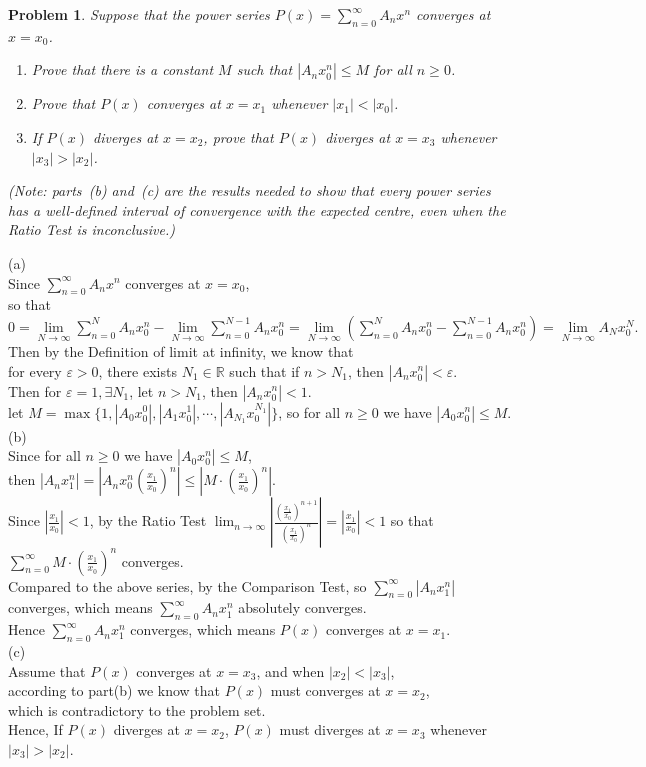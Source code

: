 \documentclass[12pt,reqno]{amsart}
\newtheorem{problem}{Problem}
\newcommand{\R}{{\mathbb R}}
\begin{document}
\medskip
\begin{problem}
Suppose that the power series $P(x) = \sum_{n=0}^\infty A_n x^n$ converges at $x=x_0$.
\begin{enumerate}
\item Prove that there is a constant $M$ such that $|A_n x_0^n| \le M$ for all $n\ge0$.
\item Prove that $P(x)$ converges at $x=x_1$ whenever $|x_1| < |x_0|$.
\item If $P(x)$ diverges at $x=x_2$, prove that $P(x)$ diverges at $x=x_3$ whenever $|x_3|>|x_2|$.
\end{enumerate}
(Note: parts~(b) and~(c) are the results needed to show that every power series has a well-defined interval of convergence with the expected centre, even when the Ratio Test is inconclusive.)
\end{problem}
(a)
\\Since $\sum\limits_{n=0}^{\infty}A_{n}x^{n}$ converges at $x=x_0$,
\\so that $0 =\lim\limits_{N\rightarrow\infty}\sum\limits_{n=0}^{N}A_{n}x_{0}^{n}-\lim\limits_{N\rightarrow\infty}\sum\limits_{n=0}^{N-1}A_{n}x_{0}^{n}=\lim\limits_{N\rightarrow\infty}(\sum\limits_{n=0}^{N}A_{n}x_{0}^{n}-\sum\limits_{n=0}^{N-1}A_{n}x_{0}^{n})=\lim\limits_{N\rightarrow\infty}A_{N}x_{0}^{N}.$\\
Then by the Definition of limit at infinity, we know that
\\for every  $\varepsilon>0$, there exists $N_1\in\R$ such that if $n>N_1$, then $|A_nx_0^n|<\varepsilon$.\\
Then for $\varepsilon=1, \exists N_{1}$, let $n>N_1$, then $|A_{n}x_{0}^{n}|<1$.\\
let $M=\max\{1,|A_{0}x_{0}^{0}|,|A_{1}x_{0}^{1}|,\cdots,|A_{N_{1}}x_{0}^{N_{1}}|\}$, so for all $n\geq 0$ we have $|A_{0}x_{0}^{n}|\leq M$.
\\(b)
\\Since for all $n\geq 0$ we have $|A_{0}x_{0}^{n}|\leq M$,
\\then $|A_{n}x_{1}^{n}|=|A_{n}x_{0}^{n}(\frac{x_{1}}{x_{0}})^{n}|\leq |M\cdot (\frac{x_{1}}{x_{0}})^{n}|$.
\\Since $|\frac{x_1}{x_0}|<1$, by the Ratio Test $\displaystyle\lim_{n\to\infty}|\frac{(\frac{x_1}{x_0})^{n+1}}{(\frac{x_1}{x_0})^n}|=|\frac{x_1}{x_0}|<1$ so that $\sum\limits_{n=0}^{\infty}M\cdot (\frac{x_{1}}{x_{0}})^{n}$ converges.  
\\Compared to the above series, by the Comparison Test, so $\sum\limits_{n=0}^{\infty}|A_{n}x_{1}^{n}|$ converges, which means $\sum\limits_{n=0}^{\infty}A_{n}x_{1}^{n}$ absolutely converges.
\\Hence $\sum\limits_{n=0}^{\infty}A_{n}x_{1}^{n}$ converges, which means $ P(x)$ converges at $x=x_{1}$.\\
(c)\\ Assume that $P(x)$ converges at $x=x_3$, and when $|x_2|<|x_3|$,
\\according to part(b) we know that $P(x)$ must converges at $x=x_2$,
\\which is contradictory to the problem set.
\\Hence, If $P(x)$ diverges at $x=x_2$, $P(x)$ must diverges at $x=x_3$ whenever $|x_3|>|x_2|$.
\end{document}
